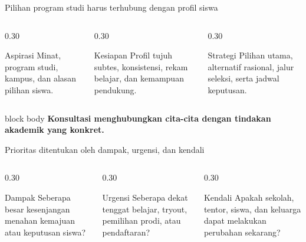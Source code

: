 \begin{frame}{Pilihan program studi harus terhubung dengan profil siswa}
  \begin{columns}[T,onlytextwidth]
    \begin{column}{0.30\textwidth}
      \begin{block}{Aspirasi}
        Minat, program studi, kampus, dan alasan pilihan siswa.
      \end{block}
    \end{column}
    \begin{column}{0.30\textwidth}
      \begin{block}{Kesiapan}
        Profil tujuh subtes, konsistensi, rekam belajar, dan kemampuan pendukung.
      \end{block}
    \end{column}
    \begin{column}{0.30\textwidth}
      \begin{block}{Strategi}
        Pilihan utama, alternatif rasional, jalur seleksi, serta jadwal keputusan.
      \end{block}
    \end{column}
  \end{columns}
  \vspace{0.26cm}
  \begin{beamercolorbox}[rounded=true,sep=0.18cm,wd=\textwidth]{block body}
    \centering\bfseries Konsultasi menghubungkan cita-cita dengan tindakan akademik yang konkret.
  \end{beamercolorbox}
\end{frame}

\begin{frame}{Prioritas ditentukan oleh dampak, urgensi, dan kendali}
  \begin{columns}[T,onlytextwidth]
    \begin{column}{0.30\textwidth}
      \begin{block}{Dampak}
        Seberapa besar kesenjangan menahan kemajuan atau keputusan siswa?
      \end{block}
    \end{column}
    \begin{column}{0.30\textwidth}
      \begin{block}{Urgensi}
        Seberapa dekat tenggat belajar, tryout, pemilihan prodi, atau pendaftaran?
      \end{block}
    \end{column}
    \begin{column}{0.30\textwidth}
      \begin{block}{Kendali}
        Apakah sekolah, tentor, siswa, dan keluarga dapat melakukan perubahan sekarang?
      \end{block}
    \end{column}
  \end{columns}
  \vspace{0.26cm}
\end{frame}

